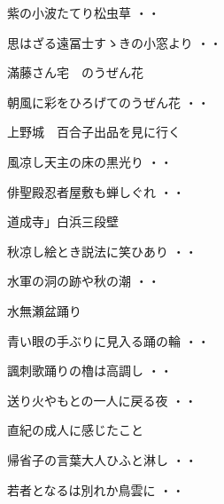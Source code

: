 \begin{shiika}紫の小波たてり松虫草
\hfill{・・}\end{shiika}
\begin{shiika}思はざる遠冨士すゝきの小窓より
\hfill{・・}\end{shiika}
\vspace{0.6cm}
滿藤さん宅　のうぜん花
\begin{shiika}朝風に彩をひろげてのうぜん花
\hfill{・・}\end{shiika}
\vspace{0.6cm}
上野城　百合子出品を見に行く
\begin{shiika}風凉し天主の床の黒光り
\hfill{・・}\end{shiika}
\vspace{0.6cm}
\begin{shiika}俳聖殿忍者屋敷も蝉しぐれ
\hfill{・・}\end{shiika}
\vspace{0.6cm}
道成寺」白浜三段壁
\begin{shiika}秋凉し絵とき説法に笑ひあり
\hfill{・・}\end{shiika}
\begin{shiika}水軍の洞の跡や秋の潮
\hfill{・・}\end{shiika}
\vspace{0.6cm}
水無瀬盆踊り
\begin{shiika}青い眼の手ぶりに見入る踊の輪
\hfill{・・}\end{shiika}
\begin{shiika}諷刺歌踊りの櫓は高調し
\hfill{・・}\end{shiika}
\begin{shiika}送り火やもとの一人に戻る夜
\hfill{・・}\end{shiika}
\vspace{0.6cm}
直紀の成人に感じたこと
\begin{shiika}帰省子の言葉大人ひふと淋し
\hfill{・・}\end{shiika}
\begin{shiika}若者となるは別れか鳥雲に
\hfill{・・}\end{shiika}
